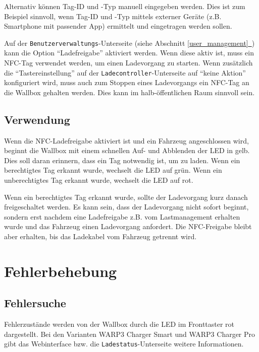 \documentclass[a4paper,10pt]{article}
\newcommand*{\fullref}[1]{Abschnitt \hyperref[{#1}]{\ref*{#1}~\nameref*{#1}}}
\begin{document}
\begin{multicols*}{2}
    Alternativ können Tag-ID und -Typ manuell eingegeben werden. Dies ist zum Beispiel sinnvoll,
    wenn Tag-ID und -Typ mittels externer Geräte (z.B. Smartphone mit passender
    App) ermittelt und eingetragen werden sollen.

    Auf der \texttt{Benutzerverwaltungs}-Unterseite (siehe \fullref{user_management}) kann die Option \enquote{Ladefreigabe} aktiviert werden.
    Wenn diese aktiv ist, muss ein NFC-Tag verwendet werden, um einen Ladevorgang zu starten.
    Wenn zusätzlich die \enquote{Tastereinstellung} auf der \texttt{Ladecontroller}-Unterseite auf \enquote{keine Aktion} konfiguriert wird,
    muss auch zum Stoppen eines Ladevorgangs ein NFC-Tag an die Wallbox gehalten werden. Dies kann im
    halb-öffentlichen Raum sinnvoll sein.

    \subsection{Verwendung}
    Wenn die NFC-Ladefreigabe aktiviert ist und ein Fahrzeug angeschlossen wird,
    beginnt die Wallbox mit einem schnellen Auf- und Abblenden der LED in gelb.
    Dies soll daran erinnern, dass ein Tag notwendig ist, um zu laden.
    Wenn ein berechtigtes Tag erkannt wurde, wechselt die LED auf grün.
    Wenn ein unberechtigtes Tag erkannt wurde, wechselt die LED auf rot.

    Wenn ein berechtigtes Tag erkannt wurde, sollte der Ladevorgang kurz danach
    freigeschaltet werden. Es kann sein, dass der Ladevorgang nicht
    sofort beginnt, sondern erst nachdem eine Ladefreigabe z.B. vom Lastmanagement erhalten wurde
    und das Fahrzeug einen Ladevorgang anfordert. Die NFC-Freigabe bleibt aber erhalten,
    bis das Ladekabel vom Fahrzeug getrennt wird.

    \newpage
    \section{Fehlerbehebung}\label{fehlerbehebung}
    \subsection{Fehlersuche}
    Fehlerzustände werden von der Wallbox durch die LED im Fronttaster rot
    dargestellt. Bei den Varianten WARP3 Charger Smart und WARP3 Charger Pro
    gibt das Webinterface bzw. die \texttt{Ladestatus}-Unterseite
    weitere Informationen.


\end{multicols*}
\end{document}

